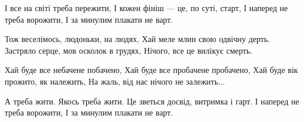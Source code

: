  
 
 

І все на світі треба пережити, 
І кожен фініш --- це, по суті, старт, 
І наперед не треба ворожити, 
І за минулим плакати не варт. 

Тож веселімось, людоньки, на людях, 
Хай меле млин свою одвічну дерть. 
Застряло серце, мов осколок в грудях, 
Нічого, все це вилікує смерть. 

Хай буде все небачене побачено, 
Хай буде все пробачене пробачено, 
Хай буде вік прожито, як належить, 
На жаль, від нас нічого не залежить... 

А треба жити. Якось треба жити. 
Це зветься досвід, витримка і гарт. 
І наперед не треба ворожити, 
І за минулим плакати не варт.

